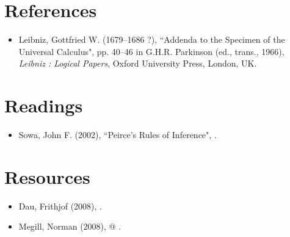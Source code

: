 \documentclass[12pt]{article}
\begin{document}
\section{References}
\begin{itemize}
\item
Leibniz, Gottfried W. (1679--1686 ?), ``Addenda to the Specimen of the Universal Calculus", pp. 40--46 in G.H.R. Parkinson (ed., trans., 1966), \textit{Leibniz : Logical Papers}, Oxford University Press, London, UK.
\end{itemize}

\section{Readings}
\begin{itemize}
\item
Sowa, John F. (2002), ``Peirce's Rules of Inference", .
\end{itemize}

\section{Resources}
\begin{itemize}
\item
Dau, Frithjof (2008), .
\item
Megill, Norman (2008),  @ .
\end{itemize}

\end{document}
